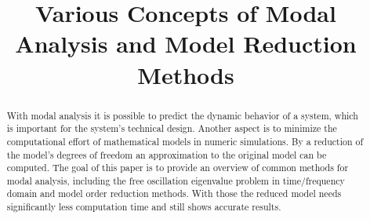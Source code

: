 \documentclass[conference]{journal}
\begin{document}
	
	\title{Various Concepts of Modal Analysis and Model Reduction Methods}
	
	\author{
	}
	
	\maketitle
	
	\begin{abstract}
		With modal analysis it is possible to predict the dynamic behavior of a system, which is  important for the system's technical design. Another aspect is to minimize the computational effort of mathematical models in numeric simulations. By a reduction of the model's degrees of freedom an approximation to the original model can be computed. The goal of this paper is to provide an overview of common methods for modal analysis, including the free oscillation eigenvalue problem in time/frequency domain and model order reduction methods. With those the reduced model needs significantly less computation time and still shows accurate results.
	\end{abstract}
	
	
	
	
	
	\IEEEpeerreviewmaketitle
	
\end{document}
